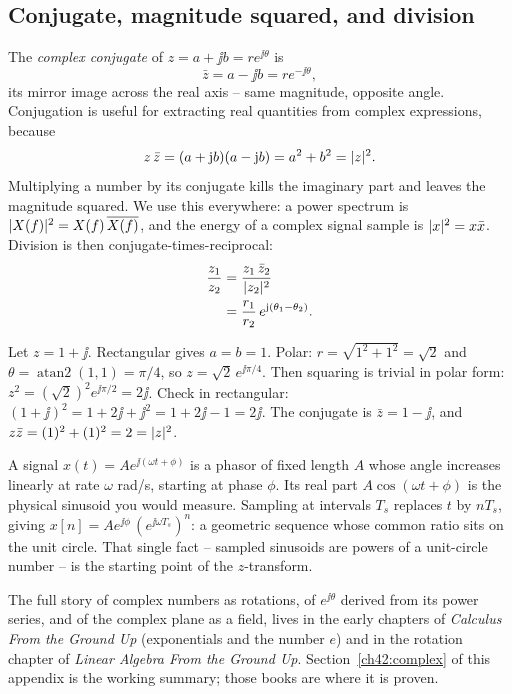 \subsection{Conjugate, magnitude squared, and division}

The \emph{complex conjugate} of $z = a + \jj b = r e^{\jj\theta}$ is
\[
  \bar z = a - \jj b = r e^{-\jj\theta},
\]
its mirror image across the real axis -- same magnitude, opposite angle. Conjugation is useful for extracting real quantities from complex expressions, because
\[
  z\,\bar z = (a+\mathrm{j} b)(a - \mathrm{j} b) = a^2 + b^2 = \lvert z\rvert^2.
\]
Multiplying a number by its conjugate kills the imaginary part and leaves the magnitude squared.
We use this everywhere: a power spectrum is $\lvert X(f)\rvert^2 = X(f)\,\overline{X(f)}$, and the energy
of a complex signal sample is $\lvert x\rvert^2 = x\bar x$. Division is then conjugate-times-reciprocal:
\begin{align*}
  \frac{z_1}{z_2} &= \frac{z_1\,\bar z_2}{\lvert z_2\rvert^2} \\
  &= \frac{r_1}{r_2}\,e^{\mathrm{j}(\theta_1 - \theta_2)}.
\end{align*}

\begin{example}
\label{ch42:ex-arith}
Let $z = 1 + \jj$. Rectangular gives $a = b = 1$. Polar: $r = \sqrt{1^2 + 1^2} = \sqrt 2$ and
$\theta = \operatorname{atan2}(1,1) = \pi/4$, so $z = \sqrt 2\,e^{\jj\pi/4}$. Then squaring is
trivial in polar form: $z^2 = (\sqrt 2)^2 e^{\jj\pi/2} = 2\jj$. Check in rectangular: $(1+\jj)^2
= 1 + 2\jj + \jj^2 = 1 + 2\jj - 1 = 2\jj$. The conjugate is $\bar z = 1 - \jj$, and $z\bar z =
(1)^2 + (1)^2 = 2 = \lvert z\rvert^2$.
\end{example}

\begin{example}
\label{ch42:ex-phasor}
A signal $x(t) = A e^{\jj(\omega t + \phi)}$ is a phasor of fixed length $A$ whose angle
increases linearly at rate $\omega$ rad/s, starting at phase $\phi$. Its real part $A\cos(\omega
t + \phi)$ is the physical sinusoid you would measure. Sampling at intervals $T_s$ replaces $t$
by $nT_s$, giving $x[n] = A e^{\jj\phi}\,(e^{\jj\omega T_s})^n$: a geometric sequence whose
common ratio sits on the unit circle. That single fact -- sampled sinusoids are powers of a
unit-circle number -- is the starting point of the $z$-transform.
\end{example}

\begin{connectionbox}
The full story of complex numbers as rotations, of $e^{\jj\theta}$ derived from its power series,
and of the complex plane as a field, lives in the early chapters of \emph{Calculus From the
Ground Up} (exponentials and the number $e$) and in the rotation chapter of \emph{Linear Algebra
From the Ground Up}. Section~\ref{ch42:complex} of this appendix is the working summary; those
books are where it is proven.
\end{connectionbox}

